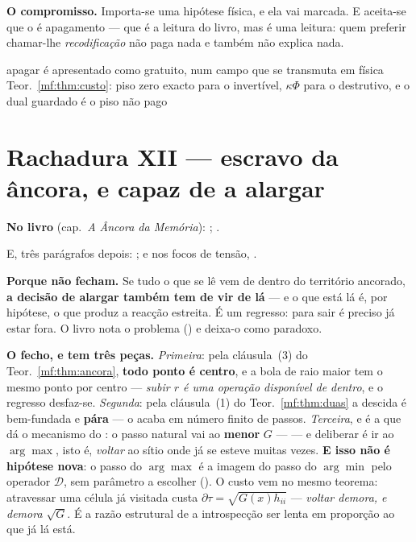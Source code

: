 \documentclass[../livro.tex]{subfiles}
\begin{document}
\medskip\noindent\textbf{O compromisso.} Importa-se uma hipótese física, e ela
vai marcada. E aceita-se que o  é apagamento --- que é a
leitura do livro, mas é uma leitura: quem preferir chamar-lhe
\emph{recodificação} não paga nada e também não explica nada.

      {apagar é apresentado como gratuito, num campo que se transmuta em física}
      {Teor.~\ref{mf:thm:custo}: piso zero exacto para o invertível,
       $\kappa\Phi$ para o destrutivo, e o dual guardado é o piso não pago}

\section{Rachadura XII --- escravo da âncora, e capaz de a alargar}\label{mf:r12}

\noindent\textbf{No livro} (cap.~\emph{A Âncora da Memória}): ; .

\noindent E, três parágrafos depois: ; e nos focos de tensão,
.

\medskip\noindent\textbf{Porque não fecham.} Se tudo o que se lê vem de dentro do
território ancorado, \textbf{a decisão de alargar também tem de vir de lá} --- e
o que está lá é, por hipótese, o que produz a reacção estreita. É um regresso:
para sair é preciso já estar fora. O livro nota o problema () e deixa-o como paradoxo.

\medskip\noindent\textbf{O fecho, e tem três peças.} \emph{Primeira}: pela
cláusula~(3) do Teor.~\ref{mf:thm:ancora}, \textbf{todo ponto é centro}, e a bola
de raio maior tem o mesmo ponto por centro --- \emph{subir $r$ é uma operação
disponível de dentro}, e o regresso desfaz-se. \emph{Segunda}: pela
cláusula~(1) do Teor.~\ref{mf:thm:duas} a descida é bem-fundada e \textbf{pára}
--- o  acaba em número finito de passos. \emph{Terceira},
e é a que dá o mecanismo do : o passo natural vai ao \textbf{menor} $G$ ---
 --- e deliberar é ir ao
$\arg\max$, isto é, \emph{voltar} ao sítio onde já se esteve muitas vezes.
\textbf{E isso não é hipótese nova}: o passo do $\arg\max$ é a imagem do passo do
$\arg\min$ pelo operador $\mathcal{D}$, sem parâmetro a escolher
(). O custo vem no mesmo
teorema: atravessar uma célula já visitada custa
$\partial\tau=\sqrt{G(x)h_{ii}}$ --- \emph{voltar demora, e demora
$\sqrt G$}. É a razão estrutural de a introspecção ser lenta em proporção ao que
já lá está.
\end{document}
